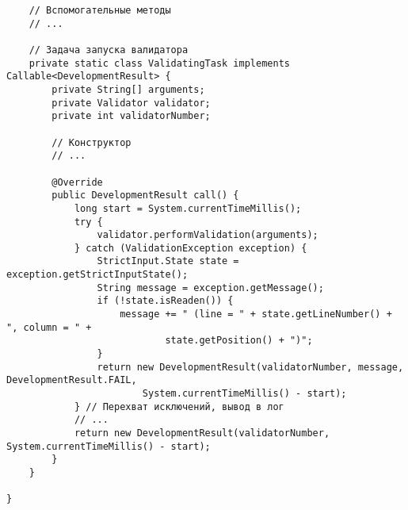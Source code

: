 \begin{verbatim}
    // Вспомогательные методы
    // ...
    
    // Задача запуска валидатора
    private static class ValidatingTask implements Callable<DevelopmentResult> {
        private String[] arguments;
        private Validator validator;
        private int validatorNumber;
        
        // Конструктор
        // ...
        
        @Override
        public DevelopmentResult call() {
            long start = System.currentTimeMillis();
            try {
                validator.performValidation(arguments);
            } catch (ValidationException exception) {
                StrictInput.State state = exception.getStrictInputState();
                String message = exception.getMessage();
                if (!state.isReaden()) {
                    message += " (line = " + state.getLineNumber() + ", column = " +
                            state.getPosition() + ")";
                }
                return new DevelopmentResult(validatorNumber, message, DevelopmentResult.FAIL,
                        System.currentTimeMillis() - start);
            } // Перехват исключений, вывод в лог
            // ...
            return new DevelopmentResult(validatorNumber, System.currentTimeMillis() - start);
        }
    }
    
}
\end{verbatim}

